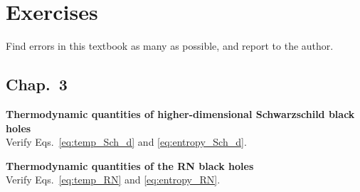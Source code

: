 \ifx\nameofpaper\undefined
  \usepackage{macro_natsuume}
  \def\beginsection{\section*}
  \def\endofsection{}
  
\else
  \def\beginsection{\chapter}
  \def\endofsection{\endinput}
\fi

\newcommand{\prerequisite}[1]{\textit{Advanced section prerequisite: #1}}
\newcommand{\ketc}{\ket_c}


\chapter{Exercises}\label{chap:exercise}
\begin{prob}
Find errors in this textbook as many as possible, and report to the author.
\end{prob}

\section*{Chap.~3}%


\begin{prob}
\textbf{Thermodynamic quantities of higher-dimensional Schwarzschild black holes}\\
Verify Eqs.~\eqref{eq:temp_Sch_d} and \eqref{eq:entropy_Sch_d}.
\end{prob}

\begin{prob}
\textbf{Thermodynamic quantities of the RN black holes}\\
Verify Eqs.~\eqref{eq:temp_RN} and \eqref{eq:entropy_RN}.
\end{prob}

